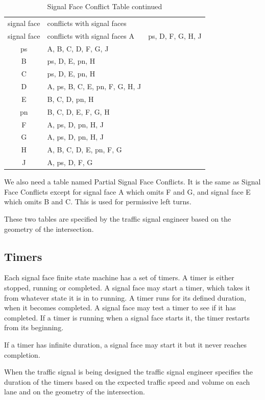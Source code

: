 \documentclass[letterpaper,twoside]{article}
\begin{document}
\begin{longtable}{c | l}
  \caption{Signal Face Conflict Table} \\
  signal face & conflicts with signal faces \endfirsthead
  \caption{Signal Face Conflict Table continued} \\
  signal face & conflicts with signal faces \endhead
  \hline
  A & ps, D, F, G, H, J \\
  ps & A, B, C, D, F, G, J \\
  B & ps, D, E, pn, H \\
  C & ps, D, E, pn, H \\
  D & A, ps, B, C, E, pn, F, G, H, J \\
  E & B, C, D, pn, H \\
  pn & B, C, D, E, F, G, H \\
  F & A, ps, D, pn, H, J \\
  G & A, ps, D, pn, H, J \\
  H & A, B, C, D, E, pn, F, G \\
  J & A, ps, D, F, G \\
\end{longtable}

We also need a table named Partial Signal Face Conflicts.  It is the same
as Signal Face Conflicts except for signal face A which omits F and G,
and signal face E which omits B and C.  This is used for permissive
left turns.

These two tables are specified by the traffic signal engineer
based on the geometry of the intersection.

\subsection{Timers}

Each signal face finite state machine has a set of timers.
A timer is either stopped, running
or completed.  A signal face may start a timer, which takes it from
whatever state it is in to running.  A timer runs for its defined duration,
when it becomes completed.  A signal face may test a timer to see if
it has completed.  If a timer is running when a signal face starts it,
the timer restarts from its beginning.

If a timer has infinite duration, a signal face may start it but
it never reaches completion.

When the traffic signal is being designed the traffic signal engineer specifies
the duration of the timers based on the expected traffic speed and volume on
each lane and on the geometry of the intersection.
\end{document}
